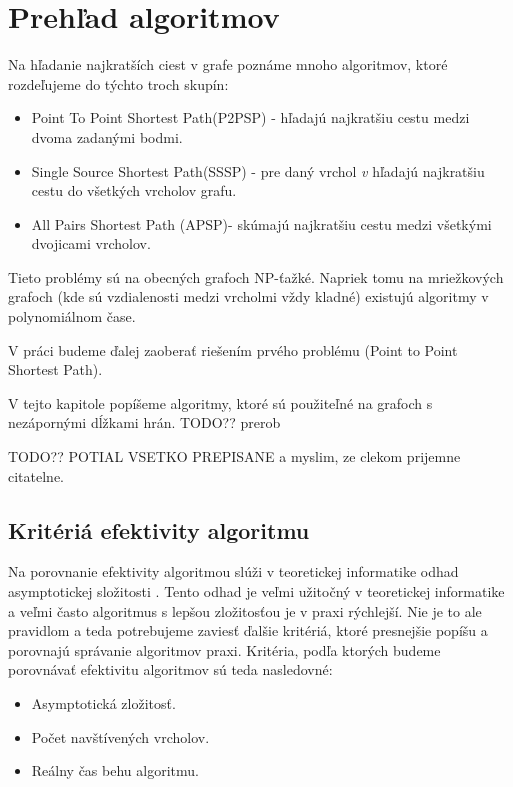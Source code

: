 \chapter{Prehľad algoritmov}
Na hľadanie najkratších ciest v grafe poznáme mnoho algoritmov, ktoré rozdeľujeme do týchto troch \cite{mares07} skupín: 


\begin{itemize}
\item Point To Point Shortest Path(P2PSP) - hľadajú najkratšiu cestu medzi dvoma zadanými bodmi.
\item Single Source Shortest Path(SSSP) - pre daný vrchol {\sl v} hľadajú najkratšiu cestu do všetkých vrcholov grafu.
\item All Pairs Shortest Path (APSP)- skúmajú najkratšiu cestu medzi všetkými dvojicami vrcholov.
\end{itemize}

Tieto problémy sú na obecných grafoch NP-ťažké.
Napriek tomu na mriežkových grafoch (kde sú vzdialenosti medzi vrcholmi vždy kladné) existujú algoritmy v polynomiálnom čase.

V práci budeme ďalej zaoberať riešením prvého problému (Point to Point Shortest Path). 

V tejto kapitole popíšeme algoritmy, ktoré sú použiteľné na grafoch s nezápornými dĺžkami hrán. TODO?? prerob

TODO?? POTIAL VSETKO PREPISANE a myslim, ze clekom prijemne citatelne.


\section{Kritériá efektivity algoritmu}
Na porovnanie efektivity algoritmou slúži v teoretickej informatike odhad asymptotickej složitosti \cite{asymptotic65}.
Tento odhad je veľmi užitočný v teoretickej informatike a veľmi často algoritmus s lepšou zložitosťou je v praxi rýchlejší.
Nie je to ale pravidlom a teda potrebujeme zaviesť ďalšie kritériá, ktoré presnejšie popíšu a porovnajú správanie algoritmov praxi.
Kritéria, podľa ktorých budeme porovnávať efektivitu algoritmov sú teda nasledovné:
\begin{itemize}
	\item Asymptotická zložitosť.
	\item Počet navštívených vrcholov.
	\item Reálny čas behu algoritmu.
\end{itemize}



